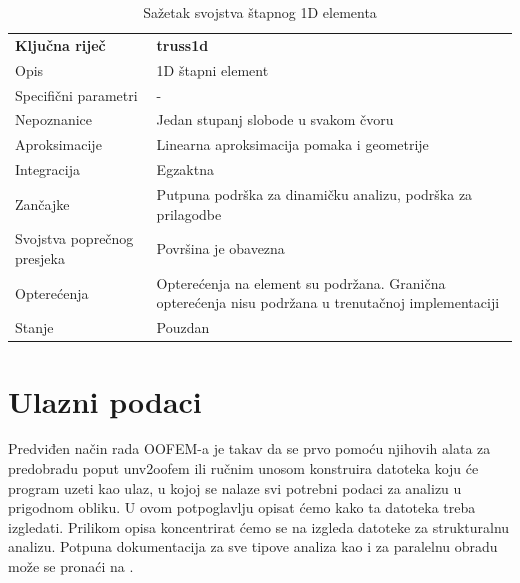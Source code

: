 \documentclass[a4paper,twoside,12pt]{memoir} %
\begin{document}
\begin{table}[h!]
\centering
\begin{tabular}{| m{9em} | m{25em}|} 
 \hline
 \textbf{Ključna riječ} & \textbf{truss1d} \\ [1ex]
 Opis & 1D štapni element \\
 Specifični parametri & - \\
 \hline
 Nepoznanice & Jedan stupanj slobode u svakom čvoru \\ 
 Aproksimacije & Linearna aproksimacija pomaka i geometrije \\
 Integracija & Egzaktna \\
 Zančajke & Putpuna podrška za dinamičku analizu, podrška za prilagodbe \\
 Svojstva poprečnog presjeka & Površina je obavezna \\
 Opterećenja & Opterećenja na element su podržana. Granična opterećenja nisu podržana u trenutačnoj implementaciji\\
 Stanje & Pouzdan \\
 \hline
\end{tabular}
\caption{Sažetak svojstva štapnog 1D elementa}
\label{tab:svojstva_stapnog_elementa}
\end{table}


\section{Ulazni podaci}
\label{poglavlje:koristenje_oofema}
Predviđen način rada OOFEM-a je takav da se prvo pomoću njihovih alata za predobradu poput unv2oofem ili ručnim unosom konstruira datoteka koju će program uzeti kao ulaz, u kojoj se nalaze svi potrebni podaci za analizu u prigodnom obliku. U ovom potpoglavlju opisat ćemo kako ta datoteka treba izgledati. Prilikom opisa koncentrirat ćemo se na izgleda datoteke za strukturalnu analizu. Potpuna dokumentacija za sve tipove analiza kao i za paralelnu obradu može se pronaći na \cite{oofem-web}. \par
\end{document}
